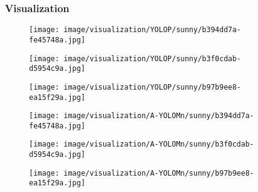 \documentclass[lettersize,journal]{IEEEtran}
\begin{document}
{\subsubsection{Visualization}
\label{subsubsec: Visualization}
\begin{figure*}[!h]
    \centering

\begin{subfigure}[b]{0.05\textwidth}
        \centering
        \vspace{0.6cm} \end{subfigure}\begin{subfigure}{0.25\textwidth}
        \centering
        \texttt{[image: image/visualization/YOLOP/sunny/b394dd7a-fe45748a.jpg]}
    \end{subfigure}\hspace{0.5cm}
    \begin{subfigure}{0.25\textwidth}
        \centering
        \texttt{[image: image/visualization/YOLOP/sunny/b3f0cdab-d5954c9a.jpg]}
    \end{subfigure}\hspace{0.5cm}
    \begin{subfigure}{0.25\textwidth}
        \centering
        \texttt{[image: image/visualization/YOLOP/sunny/b97b9ee8-ea15f29a.jpg]}
    \end{subfigure}

    \medskip

\begin{subfigure}[b]{0.05\textwidth}
        \centering
        \vspace{0.2cm}
    \end{subfigure}\begin{subfigure}{0.25\textwidth}
        \centering
        \texttt{[image: image/visualization/A-YOLOMn/sunny/b394dd7a-fe45748a.jpg]}
    \end{subfigure}\hspace{0.5cm}
    \begin{subfigure}{0.25\textwidth}
        \centering
        \texttt{[image: image/visualization/A-YOLOMn/sunny/b3f0cdab-d5954c9a.jpg]}
    \end{subfigure}\hspace{0.5cm}
    \begin{subfigure}{0.25\textwidth}
        \centering
        \texttt{[image: image/visualization/A-YOLOMn/sunny/b97b9ee8-ea15f29a.jpg]}
    \end{subfigure}


\end{figure*}}
\end{document}
